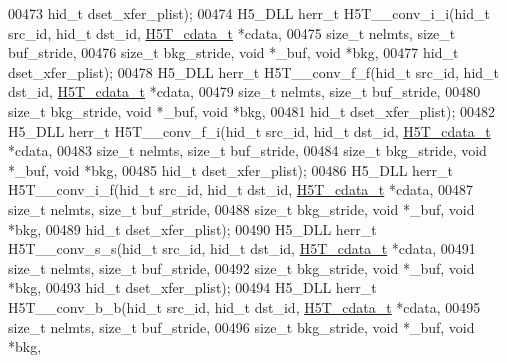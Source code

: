 \begin{DoxyCode}
00473                             hid\_t dset\_xfer\_plist);
00474 H5\_DLL herr\_t H5T\_\_conv\_i\_i(hid\_t src\_id, hid\_t dst\_id, \hyperlink{struct_h5_t__cdata__t}{H5T\_cdata\_t} *cdata,
00475                             \textcolor{keywordtype}{size\_t} nelmts, \textcolor{keywordtype}{size\_t} buf\_stride,
00476                             \textcolor{keywordtype}{size\_t} bkg\_stride, \textcolor{keywordtype}{void} *\_buf, \textcolor{keywordtype}{void} *bkg,
00477                             hid\_t dset\_xfer\_plist);
00478 H5\_DLL herr\_t H5T\_\_conv\_f\_f(hid\_t src\_id, hid\_t dst\_id, \hyperlink{struct_h5_t__cdata__t}{H5T\_cdata\_t} *cdata,
00479                 \textcolor{keywordtype}{size\_t} nelmts, \textcolor{keywordtype}{size\_t} buf\_stride,
00480                             \textcolor{keywordtype}{size\_t} bkg\_stride, \textcolor{keywordtype}{void} *\_buf, \textcolor{keywordtype}{void} *bkg,
00481                             hid\_t dset\_xfer\_plist);
00482 H5\_DLL herr\_t H5T\_\_conv\_f\_i(hid\_t src\_id, hid\_t dst\_id, \hyperlink{struct_h5_t__cdata__t}{H5T\_cdata\_t} *cdata,
00483                 \textcolor{keywordtype}{size\_t} nelmts, \textcolor{keywordtype}{size\_t} buf\_stride,
00484                             \textcolor{keywordtype}{size\_t} bkg\_stride, \textcolor{keywordtype}{void} *\_buf, \textcolor{keywordtype}{void} *bkg,
00485                             hid\_t dset\_xfer\_plist);
00486 H5\_DLL herr\_t H5T\_\_conv\_i\_f(hid\_t src\_id, hid\_t dst\_id, \hyperlink{struct_h5_t__cdata__t}{H5T\_cdata\_t} *cdata,
00487                 \textcolor{keywordtype}{size\_t} nelmts, \textcolor{keywordtype}{size\_t} buf\_stride,
00488                             \textcolor{keywordtype}{size\_t} bkg\_stride, \textcolor{keywordtype}{void} *\_buf, \textcolor{keywordtype}{void} *bkg,
00489                             hid\_t dset\_xfer\_plist);
00490 H5\_DLL herr\_t H5T\_\_conv\_s\_s(hid\_t src\_id, hid\_t dst\_id, \hyperlink{struct_h5_t__cdata__t}{H5T\_cdata\_t} *cdata,
00491                 \textcolor{keywordtype}{size\_t} nelmts, \textcolor{keywordtype}{size\_t} buf\_stride,
00492                             \textcolor{keywordtype}{size\_t} bkg\_stride, \textcolor{keywordtype}{void} *\_buf, \textcolor{keywordtype}{void} *bkg,
00493                             hid\_t dset\_xfer\_plist);
00494 H5\_DLL herr\_t H5T\_\_conv\_b\_b(hid\_t src\_id, hid\_t dst\_id, \hyperlink{struct_h5_t__cdata__t}{H5T\_cdata\_t} *cdata,
00495                 \textcolor{keywordtype}{size\_t} nelmts, \textcolor{keywordtype}{size\_t} buf\_stride,
00496                             \textcolor{keywordtype}{size\_t} bkg\_stride, \textcolor{keywordtype}{void} *\_buf, \textcolor{keywordtype}{void} *bkg,

\end{DoxyCode}
